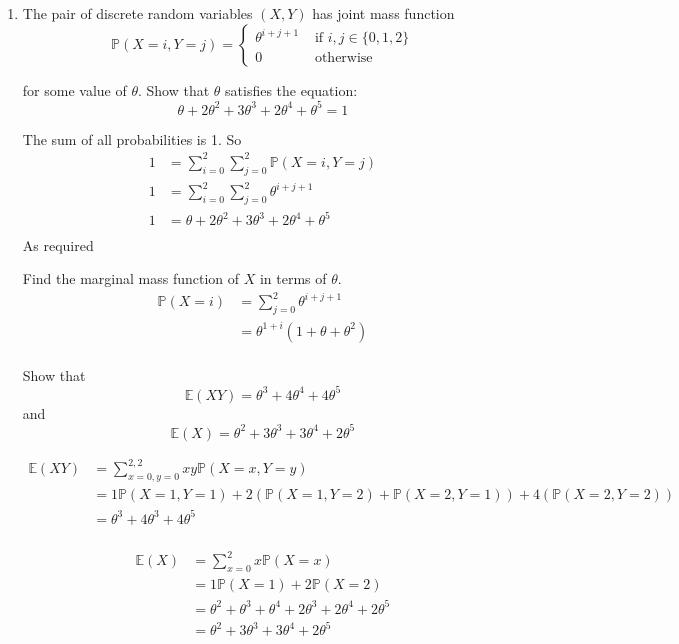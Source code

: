 \documentclass[10pt,\jkfside,a4paper]{article}
\begin{document}
\begin{enumerate}
\item

The pair of discrete random variables $(X, Y)$ has joint mass function
\[
\mathbb{P}(X = i, Y = j) = \begin{cases}
                           \theta^{i + j + 1} & \text{ if } i, j \in \{0, 1, 2\} \\
                           0 & \text{ otherwise }
                           \end{cases}
\]

for some value of $\theta$.
Show that $\theta$ satisfies the equation:
\[
\theta + 2\theta^2 + 3\theta^3 + 2\theta^4 + \theta^5 = 1
\]

The sum of all probabilities is 1.
So
\[
\begin{split}
1 &= \sum_{i=0}^2\sum_{j=0}^{2} \mathbb{P}(X = i, Y = j) \\
1 &= \sum_{i=0}^{2} \sum_{j=0}^{2} \theta^{i + j + 1} \\
1 &= \theta + 2\theta^2 + 3\theta^3 + 2\theta^4 + \theta^5 \\
\end{split}
\]
As required

Find the marginal mass function of $X$ in terms of $\theta$.
\[
\begin{split}
\mathbb{P}(X = i)
&= \sum_{j=0}^{2} \theta^{i + j + 1} \\
&= \theta^{1 + i}(1 + \theta + \theta^2) \\
\end{split}
\]

Show that
\[
\mathbb{E}(XY) = \theta^3 + 4\theta^4 + 4\theta^5
\]
and
\[
\mathbb{E}(X) = \theta^2 + 3\theta^3 + 3\theta^4 + 2\theta^5
\]

\[
\begin{split}
\mathbb{E}(XY) &= \sum^{2, 2}_{x=0, y=0} xy\mathbb{P}(X = x, Y = y) \\
&= 1\mathbb{P}(X=1,Y=1) + 2(\mathbb{P}(X=1,Y=2) + \mathbb{P}(X=2,Y=1)) + 4(\mathbb{P}(X=2,Y=2)) \\
&= \theta^3 + 4\theta^3 + 4\theta^5 \\
\end{split}
\]

\[
\begin{split}
\mathbb{E}(X) &= \sum^{2}_{x=0} x\mathbb{P}(X=x) \\
&= 1\mathbb{P}(X=1) + 2\mathbb{P}(X=2) \\
&= \theta^2 + \theta^3 + \theta^4 + 2\theta^3 + 2\theta^4 + 2\theta^5 \\
&= \theta^2 + 3\theta^3 + 3\theta^4 + 2\theta^5 \\
\end{split}
\]


\end{enumerate}
\end{document}
